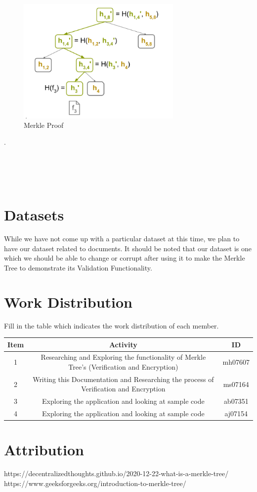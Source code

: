 \documentclass{article}
\begin{document}
\begin{figure}[htp]
    \centering
    \includegraphics[width=8cm]{Merkle Proof}
    \caption{Merkle Proof}
    \label{fig:f4}
\end{figure}
.
\\\\\\\\\\
\section{Datasets}
While we have not come up with a particular dataset at this time, we plan to have our dataset related to documents. It should be noted that our dataset is one which we should be able to change or corrupt after using it to make the Merkle Tree to demonstrate its Validation Functionality. 

\newpage
\section{Work Distribution}
Fill in the table which indicates the work distribution of each member.
\begin{center}
  \begin{table}[h]
    \centering
    \begin{tabular}{|c|c|c|}
      \hline
      Item & Activity   & ID      \\ \hline
      1    & Researching and Exploring the functionality of Merkle Tree's (Verification and Encryption) & mh07607 \\ \hline
      2    & Writing this Documentation and Researching the process of Verification and Encryption & ms07164 \\ \hline
      3    & Exploring the application and looking at sample code & ab07351 \\ \hline
      4    & Exploring the application and looking at sample code & aj07154 \\ \hline
    \end{tabular}

    \label{tab:my-table6}
  \end{table}
\end{center}
\section{Attribution}

\begin{thebibliography}{9}
https://decentralizedthoughts.github.io/2020-12-22-what-is-a-merkle-tree/
https://www.geeksforgeeks.org/introduction-to-merkle-tree/
  \end{thebibliography}
\end{document}
